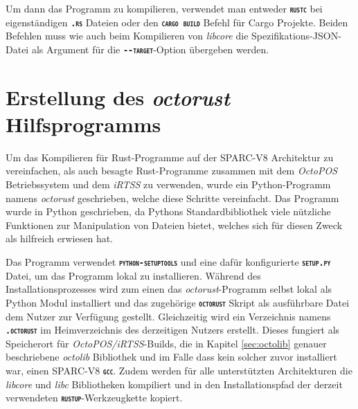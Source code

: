 Um dann das Programm zu kompilieren, verwendet man entweder \texttt{\textsc{\textbf{rustc}}} bei eigenständigen
\texttt{\textsc{\textbf{.rs}}} Dateien oder den \texttt{\textsc{\textbf{cargo build}}} Befehl für Cargo Projekte. Beiden Befehlen muss wie auch beim Kompilieren von \textit{libcore} die 
Spezifikations-JSON-Datei als Argument für die \texttt{\textsc{\textbf{-{}-target}}}-Option übergeben werden. 

\section{Erstellung des \textit{octorust} Hilfsprogramms}

Um das Kompilieren für Rust-Programme
auf der SPARC-V8 Architektur zu vereinfachen, als
auch besagte Rust-Programme zusammen mit dem \textit{OctoPOS} Betriebssystem und dem \textit{iRTSS} zu verwenden,
wurde ein Python-Programm namens \textit{octorust} geschrieben, welche diese Schritte
vereinfacht.
Das Programm wurde in Python geschrieben, da Pythons Standardbibliothek viele nützliche Funktionen zur Manipulation
von Dateien bietet, welches sich für diesen Zweck als hilfreich erwiesen hat.

Das Programm verwendet \texttt{\textsc{\textbf{python-setuptools}}} und eine dafür konfigurierte 
\texttt{\textsc{\textbf{setup.py}}} Datei, um das Programm lokal zu installieren.
Während des Installationsprozesses wird zum einen das \textit{octorust}-Programm selbst lokal als Python Modul 
installiert und das zugehörige \texttt{\textsc{\textbf{octorust}}} Skript als ausführbare Datei dem Nutzer zur 
Verfügung gestellt.
Gleichzeitig wird ein Verzeichnis namens \texttt{\textsc{\textbf{.octorust}}}
im Heimverzeichnis des derzeitigen Nutzers erstellt.
Dieses fungiert als Speicherort für \textit{OctoPOS/iRTSS}-Builds, die in Kapitel \ref{sec:octolib} genauer
beschriebene \textit{octolib} Bibliothek und im Falle dass kein solcher zuvor installiert war, einen SPARC-V8
\texttt{\textsc{\textbf{gcc}}}.
Zudem werden für alle unterstützten Architekturen die \textit{libcore} und \textit{libc} Bibliotheken
kompiliert und in den Installationspfad der derzeit verwendeten
\texttt{\textsc{\textbf{rustup}}}-Werkzeugkette kopiert.


